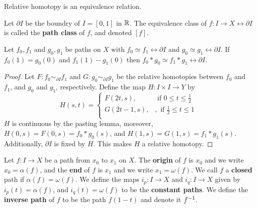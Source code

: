 \begin{lemma}\label{4.1.2}
    Relative homotopy is an equivalence relation.
\end{lemma}

\begin{definition}
    Let $\partial{I}$ be the boundry of $I=[0,1]$ in $\mathbb{R}$. The equivalence class
    of  $f:I \xrightarrow{} X \rel{\partial{I}}$ is called the \textbf{path
    class} of $f$, and denoted $[f]$.
\end{definition}

\begin{theorem}\label{4.1.3}
    Let $f_0,f_1$ and $g_0,g_1$ be paths on $X$ with  $f_0 \simeq f_1
\rel{\partial{I}}$ and $g_0 \simeq g_1 \rel{\partial{I}}$. If $f_0(1)=g_0(0)$
and $f_1(1)-g_1(0)$ then $f_0 \ast g_0 \simeq f_1 \ast g_1 \rel{\partial{I}}$.
\end{theorem}
\begin{proof}
    Let $F:f_0 \sim_{\partial{I}} f_1$ and $G:g_0 \sim_{\partial{I}} g_1$ be the
    relative homotopies between $f_0$ and $f_1$, and $g_0$ and $g_1$,
    respectively. Define the map $H:I \times I \xrightarrow{} Y$ by
    \begin{equation*}
        H(s,t)=\begin{cases}
                F(2t,s), & \text{ if } 0 \leq t \leq \frac{1}{2}    \\
                G(2t-1,s), &, \text{ if } \frac{1}{2} \leq t \leq 1 \\
            \end{cases}
    \end{equation*}
    $H$ is continuous by the pasting lemma, moreover,  $H(0,s)=F(0,s)=f_0 \ast
    g_0(s)$, and $H(1,s)=G(1,s)=f_1 \ast g_1(s)$. Additionally, $\partial{I}$ is
    fixed by $H$. This makes  $H$ a relative homotopy.
\end{proof}

\begin{definition}
    Let $f:I \xrightarrow{} X$ be a path from $x_0$ to $x_1$ on $X$. The
    \textbf{origin} of $f$ is  $x_0$ and we write $x_0=\alpha(f)$, and the
    \textbf{end} of $f$ is  $x_1$ and we write $x_1=\omega(f)$. We call $f$ a
     \textbf{closed} path if $\alpha(f)=\omega(f)$. We define the maps $i_p:I
     \xrightarrow{} X$ and $i_q:I \xrightarrow{} X$ given by
     $i_p(t)=\alpha(f)$, and $i_q(t)=\omega(f)$ to be the \textbf{constant
     paths}. We define the \textbf{inverse path} of $f$ to be the path
     $f(1-t)$ and denote it $f^{-1}$.
\end{definition}

